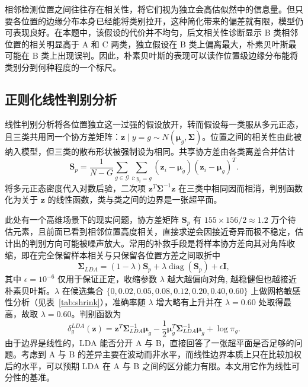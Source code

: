\documentclass[12pt,a4paper]{article}
\newcommand{\upcite}[1]{\cite{#1}}
\begin{document}
相邻检测位置之间往往存在相关性，将它们视为独立会高估似然中的信息量。但只要各位置的边缘分布本身已经能将类别拉开，这种简化带来的偏差就有限，模型仍可表现良好\upcite{handyu2001}。在本题中，该假设的代价并不均匀，后文相关性诊断显示 B 类相邻位置的相关明显高于 A 和 C 两类，独立假设在 B 类上偏离最大，朴素贝叶斯最可能在 B 类上出现误判。因此，朴素贝叶斯的表现可以读作位置级边缘分布能将类别分到何种程度的一个标尺。

\subsection{正则化线性判别分析}

线性判别分析\upcite{fisher1936}将各位置独立这一过强的假设放开，转而假设每一类服从多元正态，且三类共用同一个协方差矩阵：$\mathbf{z}\mid y=g\sim N(\boldsymbol{\mu}_g,\boldsymbol{\Sigma})$。位置之间的相关性由此被纳入模型，但三类的散布形状被强制设为相同。共享协方差由各类离差合并估计
\begin{equation}
\mathbf{S}_p=\frac{1}{N-G}\sum_{g\in\mathcal{G}}\sum_{i:y_i=g}(\mathbf{z}_i-\boldsymbol{\mu}_g)(\mathbf{z}_i-\boldsymbol{\mu}_g)^{T}.
\end{equation}
将多元正态密度代入对数后验，二次项 $\mathbf{z}^T\boldsymbol{\Sigma}^{-1}\mathbf{z}$ 在三类中相同因而相消，判别函数化为关于 $\mathbf{z}$ 的线性函数，类与类之间的边界是一张超平面。

此处有一个高维场景下的现实问题，协方差矩阵 $\mathbf{S}_p$ 有 $155\times156/2\approx1.2$ 万个待估元素，且前面已看到相邻位置高度相关，直接求逆会因接近奇异而极不稳定，估计出的判别方向可能被噪声放大。常用的补救手段是将样本协方差向其对角阵收缩\upcite{friedman1989}，即在完全保留样本相关与只保留各位置方差之间取折中
\begin{equation}
\boldsymbol{\Sigma}_{LDA}=(1-\lambda)\mathbf{S}_p+\lambda\operatorname{diag}(\mathbf{S}_p)+\epsilon\mathbf{I},
\end{equation}
其中 $\epsilon=10^{-6}$ 仅用于保证正定，收缩参数 $\lambda$ 越大越偏向对角, 越稳健但也越接近朴素贝叶斯。$\lambda$ 在候选集合 $\{0,0.02,0.05,0.08,0.12,0.20,0.40,0.60\}$ 上做网格敏感性分析（见表~\ref{tab:shrink}），准确率随 $\lambda$ 增大略有上升并在 $\lambda=0.60$ 处取得最高，故取 $\lambda=0.60$。判别函数为
\begin{equation}
\delta_g^{LDA}(\mathbf{z})=\mathbf{z}^{T}\boldsymbol{\Sigma}_{LDA}^{-1}\boldsymbol{\mu}_g
-\frac{1}{2}\boldsymbol{\mu}_g^{T}\boldsymbol{\Sigma}_{LDA}^{-1}\boldsymbol{\mu}_g+\log\pi_g.
\end{equation}
由于边界是线性的，LDA 能否分开 A 与 B，直接回答了一张超平面是否足够的问题。考虑到 A 与 B 的差异主要在波动而非水平，而线性边界本质上只在比较加权后的水平，可以预期 LDA 在 A 与 B 之间的区分能力有限。本文用它作为线性可分性的基准。
\end{document}
